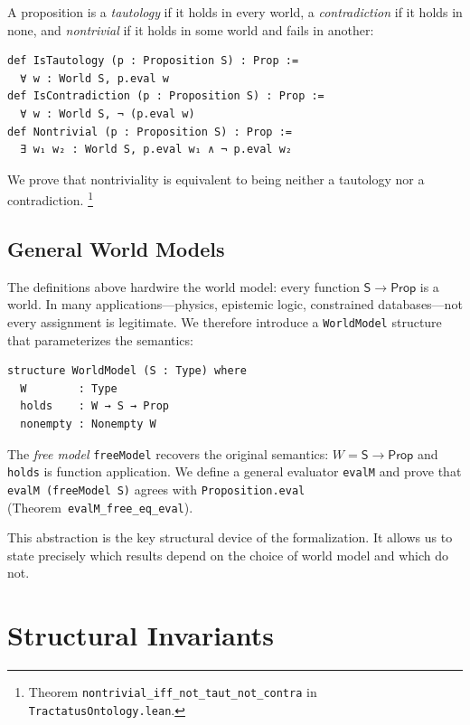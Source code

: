 \documentclass[10pt, letterpaper]{article}
\theoremstyle{definition}
\theoremstyle{remark}
\newcommand{\Sach}{\mathsf{S}}
\newcommand{\Prop}{\mathsf{Prop}}
\begin{document}
A proposition is a \emph{tautology} if it holds in every world,
a \emph{contradiction} if it holds in none, and
\emph{nontrivial} if it holds in some world and fails in
another:

\begin{lstlisting}
def IsTautology (p : Proposition S) : Prop :=
  ∀ w : World S, p.eval w
def IsContradiction (p : Proposition S) : Prop :=
  ∀ w : World S, ¬ (p.eval w)
def Nontrivial (p : Proposition S) : Prop :=
  ∃ w₁ w₂ : World S, p.eval w₁ ∧ ¬ p.eval w₂
\end{lstlisting}

\noindent
We prove that nontriviality is equivalent to being neither a
tautology nor a contradiction.%
\footnote{Theorem \texttt{nontrivial\_iff\_not\_taut\_not\_contra}
  in \texttt{TractatusOntology.lean}.}

\subsection{General World Models}
\label{sec:worldmodel}

The definitions above hardwire the world model: every
function $\Sach \to \Prop$ is a world.  In many
applications---physics, epistemic logic, constrained
databases---not every assignment is legitimate.
We therefore introduce a \texttt{WorldModel} structure
that parameterizes the semantics:

\begin{lstlisting}
structure WorldModel (S : Type) where
  W        : Type
  holds    : W → S → Prop
  nonempty : Nonempty W
\end{lstlisting}

\noindent
The \emph{free model} \texttt{freeModel} recovers the original
semantics: $W = \Sach \to \Prop$ and \texttt{holds} is function
application.  We define a general evaluator \texttt{evalM} and
prove that \texttt{evalM (freeModel S)} agrees with
\texttt{Proposition.eval} (Theorem~\texttt{evalM\_free\_eq\_eval}).

This abstraction is the key structural device of the
formalization.  It allows us to state precisely which results
depend on the choice of world model and which do not.

\section{Structural Invariants}
\label{sec:invariants}
\end{document}
